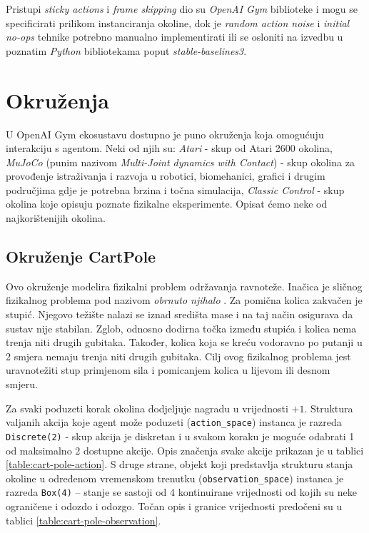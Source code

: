 Pristupi \textit{sticky actions} i \textit{frame skipping} dio su \textit{OpenAI Gym} biblioteke i mogu se specificirati prilikom instanciranja okoline, dok je \textit{random action noise} i \textit{initial no-ops} tehnike potrebno manualno implementirati ili se osloniti na izvedbu u poznatim \textit{Python} bibliotekama poput \textit{stable-baselines3}.

\section{Okruženja}

U OpenAI Gym ekosustavu dostupno je puno okruženja koja omogućuju interakciju s agentom. Neki od njih su: \textit{Atari} - skup od Atari 2600 okolina, \textit{MuJoCo} (punim nazivom \textit{Multi-Joint dynamics with Contact}) - skup okolina za provođenje istraživanja i razvoja u robotici, biomehanici, grafici i drugim područjima gdje je potrebna brzina i točna simulacija, \textit{Classic Control} - skup okolina koje opisuju poznate fizikalne eksperimente. Opisat ćemo neke od najkorištenijih okolina.

\subsection{Okruženje CartPole}

Ovo okruženje modelira fizikalni problem održavanja ravnoteže. Inačica je sličnog fizikalnog problema pod nazivom \textit{obrnuto njihalo} . Za pomična kolica zakvačen je stupić. Njegovo težište nalazi se iznad središta mase i na taj način osigurava da sustav nije stabilan.  Zglob, odnosno dodirna točka između stupića i kolica nema trenja niti drugih gubitaka. Također, kolica koja se kreću vodoravno po putanji u 2 smjera nemaju trenja niti drugih gubitaka. Cilj ovog fizikalnog problema jest uravnotežiti stup primjenom sila i pomicanjem kolica u lijevom ili desnom smjeru.

Za svaki poduzeti korak okolina dodjeljuje nagradu u vrijednosti $+1$. Struktura valjanih akcija koje agent može poduzeti (\texttt{action_space}) instanca je razreda \texttt{Disc\-rete(2)} - skup akcija je diskretan i u svakom koraku je moguće odabrati 1 od maksimalno 2 dostupne akcije. Opis značenja svake akcije prikazan je u tablici \ref{table:cart-pole-action}. S druge strane, objekt koji predstavlja strukturu stanja okoline u određenom vremenskom trenutku (\texttt{observation_space}) instanca je razreda \texttt{Box(4)} – stanje se sastoji od 4 kontinuirane vrijednosti od kojih su neke ograničene i odozdo i odozgo. Točan opis i granice vrijednosti predočeni su u tablici \ref{table:cart-pole-observation}.

